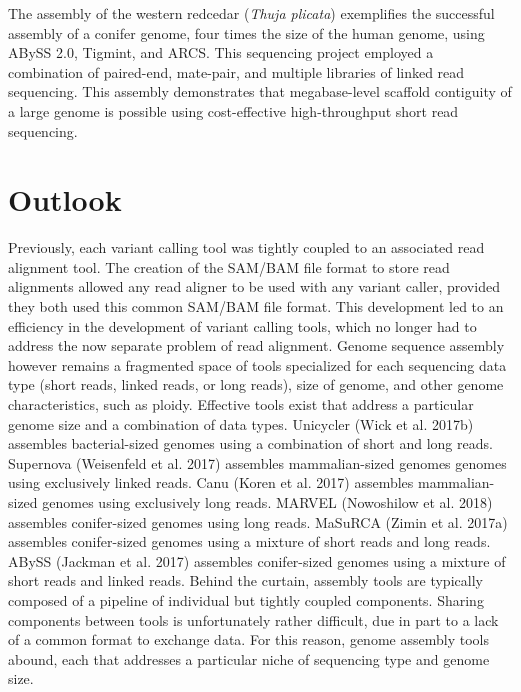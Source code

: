 \documentclass[
  12pt,
  oneside,
  openany]{book}
\begin{document}
The assembly of the western redcedar (\emph{Thuja plicata}) exemplifies the successful assembly of a conifer genome, four times the size of the human genome, using ABySS 2.0, Tigmint, and ARCS. This sequencing project employed a combination of paired-end, mate-pair, and multiple libraries of linked read sequencing. This assembly demonstrates that megabase-level scaffold contiguity of a large genome is possible using cost-effective high-throughput short read sequencing.

\hypertarget{outlook}{%
\section{Outlook}\label{outlook}}

Previously, each variant calling tool was tightly coupled to an associated read alignment tool. The creation of the SAM/BAM file format to store read alignments allowed any read aligner to be used with any variant caller, provided they both used this common SAM/BAM file format. This development led to an efficiency in the development of variant calling tools, which no longer had to address the now separate problem of read alignment. Genome sequence assembly however remains a fragmented space of tools specialized for each sequencing data type (short reads, linked reads, or long reads), size of genome, and other genome characteristics, such as ploidy. Effective tools exist that address a particular genome size and a combination of data types. Unicycler (Wick et al. 2017b) assembles bacterial-sized genomes using a combination of short and long reads. Supernova (Weisenfeld et al. 2017) assembles mammalian-sized genomes genomes using exclusively linked reads. Canu (Koren et al. 2017) assembles mammalian-sized genomes using exclusively long reads. MARVEL (Nowoshilow et al. 2018) assembles conifer-sized genomes using long reads. MaSuRCA (Zimin et al. 2017a) assembles conifer-sized genomes using a mixture of short reads and long reads. ABySS (Jackman et al. 2017) assembles conifer-sized genomes using a mixture of short reads and linked reads. Behind the curtain, assembly tools are typically composed of a pipeline of individual but tightly coupled components. Sharing components between tools is unfortunately rather difficult, due in part to a lack of a common format to exchange data. For this reason, genome assembly tools abound, each that addresses a particular niche of sequencing type and genome size.
\end{document}
